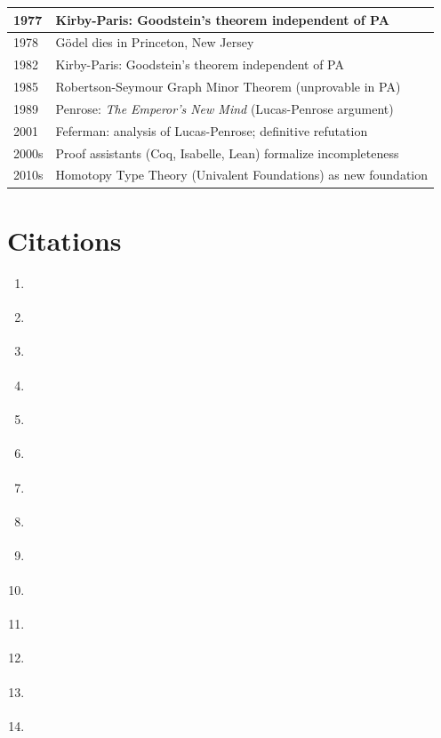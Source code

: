 \begin{tabularx}{\linewidth}{|l|X|}
1977 & Kirby-Paris: Goodstein's theorem independent of PA \\ \hline
1978 & Gödel dies in Princeton, New Jersey \\ \hline
1982 & Kirby-Paris: Goodstein's theorem independent of PA \\ \hline
1985 & Robertson-Seymour Graph Minor Theorem (unprovable in PA) \\ \hline
1989 & Penrose: \emph{The Emperor's New Mind} (Lucas-Penrose argument) \\ \hline
2001 & Feferman: analysis of Lucas-Penrose; definitive refutation \\ \hline
2000s & Proof assistants (Coq, Isabelle, Lean) formalize incompleteness \\ \hline
2010s & Homotopy Type Theory (Univalent Foundations) as new foundation \\ \hline
\end{tabularx}

\section{Citations}
\label{sec:godel:citations}

\begin{enumerate}
  \item \cite{godel1931}
  \item \cite{godel1931b}
  \item \cite{rosser1936}
  \item \cite{gentzen1936}
  \item \cite{cohen1963}
  \item \cite{smorynski1977}
  \item \cite{boolos1993}
  \item \cite{franzen2005}
  \item \cite{smith2007}
  \item \cite{chaitin1975}
  \item \cite{paris1977}
  \item \cite{kirby1982}
  \item \cite{penrose1989}
  \item \cite{feferman1960}
\end{enumerate}

